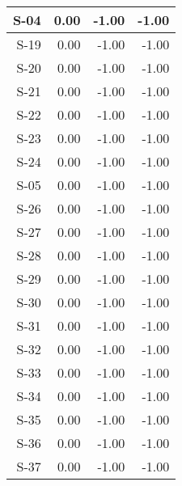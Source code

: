 \begin{tabular}{ | r | r | r | r | }
    \hline
                  S-04  &            0.00  &           -1.00  &           -1.00  \\
    \hline
                  S-19  &            0.00  &           -1.00  &           -1.00  \\
    \hline
                  S-20  &            0.00  &           -1.00  &           -1.00  \\
    \hline
                  S-21  &            0.00  &           -1.00  &           -1.00  \\
    \hline
                  S-22  &            0.00  &           -1.00  &           -1.00  \\
    \hline
                  S-23  &            0.00  &           -1.00  &           -1.00  \\
    \hline
                  S-24  &            0.00  &           -1.00  &           -1.00  \\
    \hline
                  S-05  &            0.00  &           -1.00  &           -1.00  \\
    \hline
                  S-26  &            0.00  &           -1.00  &           -1.00  \\
    \hline
                  S-27  &            0.00  &           -1.00  &           -1.00  \\
    \hline
                  S-28  &            0.00  &           -1.00  &           -1.00  \\
    \hline
                  S-29  &            0.00  &           -1.00  &           -1.00  \\
    \hline
                  S-30  &            0.00  &           -1.00  &           -1.00  \\
    \hline
                  S-31  &            0.00  &           -1.00  &           -1.00  \\
    \hline
                  S-32  &            0.00  &           -1.00  &           -1.00  \\
    \hline
                  S-33  &            0.00  &           -1.00  &           -1.00  \\
    \hline
                  S-34  &            0.00  &           -1.00  &           -1.00  \\
    \hline
                  S-35  &            0.00  &           -1.00  &           -1.00  \\
    \hline
                  S-36  &            0.00  &           -1.00  &           -1.00  \\
    \hline
                  S-37  &            0.00  &           -1.00  &           -1.00  \\

\end{tabular}

